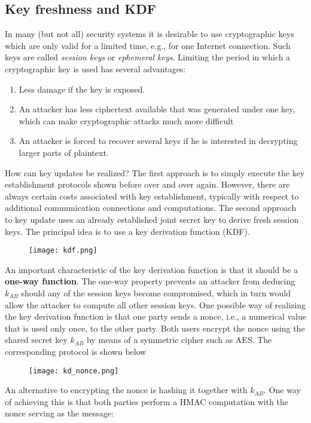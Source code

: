 \documentclass{article}
\begin{document}
\subsection{Key freshness and KDF}
In many (but not all) security systems it is desirable to use cryptographic keys which
are only valid for a limited time, e.g., for one Internet connection. Such keys are
called \textit{session keys} or \textit{ephemeral keys}. Limiting the period in which a cryptographic
key is used has several advantages:
\begin{enumerate}
    \item Less damage if the key is exposed.
    \item An attacker has less ciphertext available that was generated under one key, which can make cryptographic attacks much more difficult
    \item An attacker is forced to recover several keys if he is interested in decrypting larger parts of plaintext.
\end{enumerate}
How can key updates be realized?
The first approach is to simply execute
the key establishment protocols shown before over and over again. However, there are always certain costs associated with key establishment, typically with respect to additional communication connections and computations.
The second approach to key update uses an already established joint secret key
to derive fresh session keys. The principal idea is to use a key derivation function
(KDF).
\begin{figure} [H]
    \centering
    \texttt{[image: kdf.png]}
\end{figure}
An important characteristic of the key derivation function is that it should be a \textbf{one-way function}. The one-way property prevents an attacker from deducing $k_{AB}$
should any of the session keys become compromised, which in turn would allow the
attacker to compute all other session keys.
One possible way of realizing the key derivation function is that one party sends
a nonce, i.e., a numerical value that is used only once, to the other party. Both users
encrypt the nonce using the shared secret key $k_{AB}$ by means of a symmetric cipher
such as AES. The corresponding protocol is shown below
\begin{figure} [H]
    \centering
    \texttt{[image: kd\_nonce.png]}
\end{figure}
An alternative to encrypting the nonce is hashing it together with $k_{AB}$. One way of achieving this is that both parties perform a HMAC computation with the nonce serving as the message:
\end{document}

